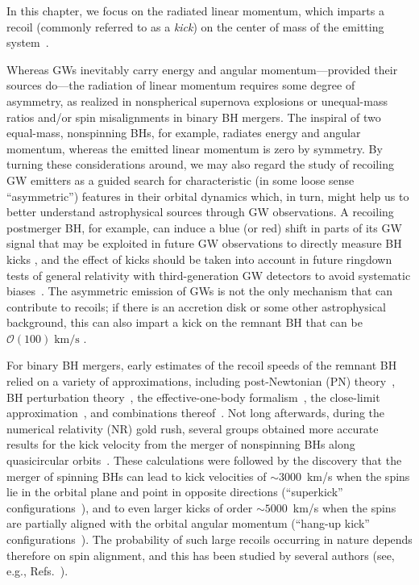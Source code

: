 In this chapter, we focus on the radiated linear momentum, which
imparts a recoil (commonly referred to as a \emph{kick}) on the center
of mass of the emitting
system~\cite{Bonnor1961-wy,Peres:1962zz,Bekenstein:1973zz}.

Whereas GWs inevitably carry energy and angular momentum---provided
their sources do---the radiation of linear momentum requires some
degree of asymmetry, as realized in nonspherical supernova explosions
or unequal-mass ratios and/or spin misalignments in binary BH
mergers. The inspiral of two equal-mass, nonspinning BHs, for example,
radiates energy and angular momentum, whereas the emitted linear
momentum is zero by symmetry. By turning these considerations around,
we may also regard the study of recoiling GW emitters as a guided
search for characteristic (in some loose sense ``asymmetric'')
features in their orbital dynamics which, in turn, might help us to
better understand astrophysical sources through GW observations.
A recoiling postmerger BH, for example, can induce a blue (or
red) shift in parts of its GW signal that may be exploited in future
GW observations to directly measure BH kicks
\cite{Gerosa:2016vip,CalderonBustillo:2018zuq,Lousto:2019lyf}, and
the effect of kicks should be taken into account in future ringdown
tests of general relativity with third-generation GW detectors to
avoid systematic biases~\cite{Varma:2020nbm}.
The asymmetric emission of GWs is not the only mechanism that 
can contribute to recoils; if there is an accretion disk or some other
astrophysical background, this can also impart a kick on the remnant
BH that can be $\mathcal{O}(100)\;\mathrm{km/s}$ \cite{Cardoso:2020lxx}.

For binary BH mergers, early estimates of the recoil speeds of the
remnant BH relied on a variety of approximations, including
post-Newtonian (PN) theory~\cite{Fitchett1983-xq,Blanchet:2005rj}, BH
perturbation theory~\cite{Hughes:2004ck}, the effective-one-body
formalism~\cite{Damour:2006tr}, the close-limit
approximation~\cite{Sopuerta:2006wj,Sopuerta:2006et}, and combinations
thereof~\cite{LeTiec:2009yg}. Not long afterwards, during the
numerical relativity (NR) gold rush, several groups obtained more
accurate results for the kick velocity from the merger of nonspinning
BHs along
quasicircular
orbits~\cite{Baker:2006vn,Gonzalez:2006md,Herrmann:2007cwl}.
These calculations were followed by the discovery that the merger of
spinning BHs can lead to kick velocities of $\sim 3000$~km/s when the
spins lie in the orbital plane and point in opposite directions
(``superkick''
configurations~\cite{Gonzalez:2007hi,Campanelli:2007cga,Campanelli:2007ew}),
and to even larger kicks of order $\sim 5000$~km/s when the spins are
partially aligned with the orbital angular momentum (``hang-up kick''
configurations~\cite{Lousto:2011kp}). 
The probability of such large
recoils occurring in nature depends therefore on spin alignment, and
this has been studied by several authors (see, e.g.,
Refs.~\cite{Schnittman:2007sn,Dotti:2009vz,Kesden:2010ji,Lousto:2012su,Berti:2012zp,Lousto:2012su}).


